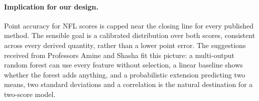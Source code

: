 \paragraph{Implication for our design.} Point accuracy for NFL scores is capped near the closing line for every published method. The sensible goal is a calibrated distribution over both scores, consistent across every derived quantity, rather than a lower point error. The suggestions received from Professors Amine and Shasha fit this picture: a multi-output random forest can use every feature without selection, a linear baseline shows whether the forest adds anything, and a probabilistic extension predicting two means, two standard deviations and a correlation is the natural destination for a two-score model.
